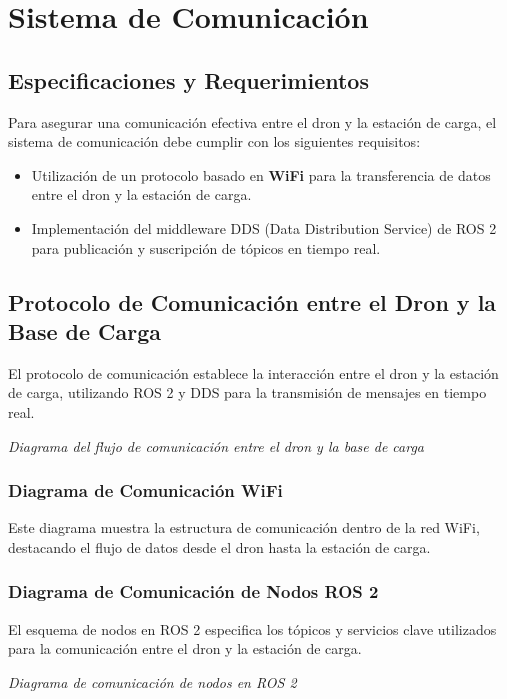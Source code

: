 \section{Sistema de Comunicación}
\subsection{Especificaciones y Requerimientos} 
Para asegurar una comunicación efectiva entre el dron y la estación de carga, el sistema de comunicación debe cumplir con los siguientes requisitos:

    \begin{itemize} 
        \item Utilización de un protocolo basado en \textbf{WiFi} para la transferencia de datos entre el dron y la estación de carga. 
        \item Implementación del middleware DDS (Data Distribution Service) de ROS 2 para publicación y suscripción de tópicos en tiempo real. 
    \end{itemize}

\subsection{Protocolo de Comunicación entre el Dron y la Base de Carga} 
El protocolo de comunicación establece la interacción entre el dron y la estación de carga, utilizando ROS 2 y DDS para la transmisión de mensajes en tiempo real.

    \begin{center} 
        \textit{Diagrama del flujo de comunicación entre el dron y la base de carga} 
    \end{center}

\subsubsection{Diagrama de Comunicación WiFi} 
Este diagrama muestra la estructura de comunicación dentro de la red WiFi, destacando el flujo de datos desde el dron hasta la estación de carga.

\subsubsection{Diagrama de Comunicación de Nodos ROS 2} 
El esquema de nodos en ROS 2 especifica los tópicos y servicios clave utilizados para la comunicación entre el dron y la estación de carga.

    \begin{center} 
        \textit{Diagrama de comunicación de nodos en ROS 2} 
    \end{center}




